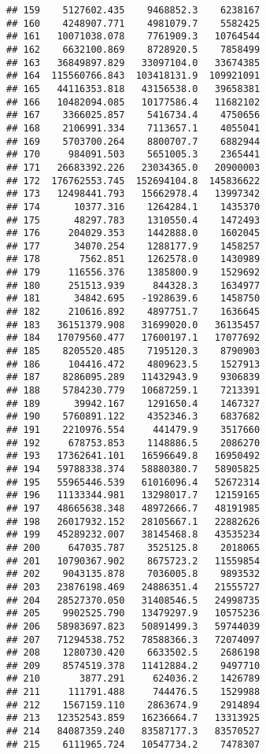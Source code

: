\documentclass[
]{article}
\begin{document}
\begin{verbatim}
## 159    5127602.435    9468852.3    6238167
## 160    4248907.771    4981079.7    5582425
## 161   10071038.078    7761909.3   10764544
## 162    6632100.869    8728920.5    7858499
## 163   36849897.829   33097104.0   33674385
## 164  115560766.843  103418131.9  109921091
## 165   44116353.818   43156538.0   39658381
## 166   10482094.085   10177586.4   11682102
## 167    3366025.857    5416734.4    4750656
## 168    2106991.334    7113657.1    4055041
## 169    5703700.264    8800707.7    6882944
## 170     984091.503    5651005.3    2365441
## 171   26683392.226   23034365.0   20900003
## 172  176762553.745  152694104.8  145836622
## 173   12498441.793   15662978.4   13997342
## 174      10377.316    1264284.1    1435370
## 175      48297.783    1310550.4    1472493
## 176     204029.353    1442888.0    1602045
## 177      34070.254    1288177.9    1458257
## 178       7562.851    1262578.0    1430989
## 179     116556.376    1385800.9    1529692
## 180     251513.939     844328.3    1634977
## 181      34842.695   -1928639.6    1458750
## 182     210616.892    4897751.7    1636645
## 183   36151379.908   31699020.0   36135457
## 184   17079560.477   17600197.1   17077692
## 185    8205520.485    7195120.3    8790903
## 186     104416.472    4809623.5    1527913
## 187    8286095.289   11432943.9    9306839
## 188    5784230.779   10687259.1    7213391
## 189      39942.167    1291650.4    1467327
## 190    5760891.122    4352346.3    6837682
## 191    2210976.554     441479.9    3517660
## 192     678753.853    1148886.5    2086270
## 193   17362641.101   16596649.8   16950492
## 194   59788338.374   58880380.7   58905825
## 195   55965446.539   61016096.4   52672314
## 196   11133344.981   13298017.7   12159165
## 197   48665638.348   48972666.7   48191985
## 198   26017932.152   28105667.1   22882626
## 199   45289232.007   38145468.8   43535234
## 200     647035.787    3525125.8    2018065
## 201   10790367.902    8675723.2   11559854
## 202    9043135.878    7036005.8    9893532
## 203   23876198.469   24886351.4   21555727
## 204   28527370.050   31408546.5   24998735
## 205    9902525.790   13479297.9   10575236
## 206   58983697.823   50891499.3   59744039
## 207   71294538.752   78588366.3   72074097
## 208    1280730.420    6633502.5    2686198
## 209    8574519.378   11412884.2    9497710
## 210       3877.291     624036.2    1426789
## 211     111791.488     744476.5    1529988
## 212    1567159.110    2863674.9    2914894
## 213   12352543.859   16236664.7   13313925
## 214   84087359.240   83587177.3   83570527
## 215    6111965.724   10547734.2    7478307

\end{verbatim}
\end{document}
